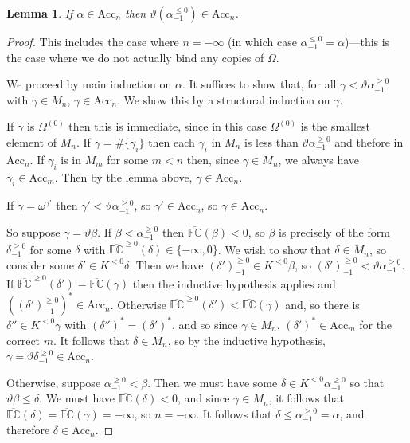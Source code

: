\documentclass[11pt]{amsart}
\newtheorem{lemma}[theorem]{Lemma}
\theoremstyle{definition}
\begin{document}
\begin{lemma}
  If $\alpha\in\mathrm{Acc}_n$ then $\vartheta(\alpha^{\leq 0}_{-1})\in\mathrm{Acc}_n$.
\end{lemma}
\begin{proof}
  This includes the case where $n=-\infty$ (in which case $\alpha^{\leq 0}_{-1}=\alpha$)---this is the case where we do not actually bind any copies of $\Omega$.

  We proceed by main induction on $\alpha$. It suffices to show that, for all $\gamma<\vartheta\alpha^{\geq 0}_{-1}$ with $\gamma\in M_n$, $\gamma\in\mathrm{Acc}_n$. We show this by a structural induction on $\gamma$.

  If $\gamma$ is $\Omega^{(0)}$ then this is immediate, since in this case $\Omega^{(0)}$ is the smallest element of $M_n$. If $\gamma=\#\{\gamma_i\}$ then each $\gamma_i$ in $M_n$ is less than $\vartheta\alpha^{\geq 0}_{-1}$ and thefore in $\mathrm{Acc}_n$. If $\gamma_i$ is in $M_m$ for some $m<n$ then, since $\gamma\in M_n$, we always have $\gamma_i\in\mathrm{Acc}_m$. Then by the lemma above, $\gamma\in\mathrm{Acc}_n$.

  If $\gamma=\omega^{\gamma'}$ then $\gamma'<\vartheta\alpha^{\geq 0}_{-1}$, so $\gamma'\in\mathrm{Acc}_n$, so $\gamma\in\mathrm{Acc}_n$.

  So suppose $\gamma=\vartheta\beta$. If $\beta<\alpha^{\geq 0}_{-1}$ then $\overline{\mathbb{FC}}(\beta)<0$, so $\beta$ is precisely of the form $\delta^{\geq 0}_{-1}$ for some $\delta$ with $\overline{\mathbb{FC}}^{\geq 0}(\delta)\in\{-\infty,0\}$. We wish to show that $\delta\in M_n$, so consider some $\delta'\in K^{< 0}\delta$. Then we have $(\delta')^{\geq 0}_{-1}\in K^{< 0}\beta$, so $(\delta')^{\geq 0}_{-1}<\vartheta\alpha^{\geq 0}_{-1}$. If $\overline{\mathbb{FC}}^{\geq 0}(\delta')=\overline{\mathbb{FC}}(\gamma)$ then the inductive hypothesis applies and $((\delta')^{\geq 0}_{-1})^*\in\mathrm{Acc}_n$. Otherwise $\overline{\mathbb{FC}}^{\geq 0}(\delta')<\overline{\mathbb{FC}}(\gamma)$ and, so there is $\delta''\in K^{< 0}\gamma$ with $(\delta'')^*=(\delta')^*$, and so since $\gamma\in M_n$, $(\delta')^*\in\mathrm{Acc}_m$ for the correct $m$. It follows that $\delta\in M_n$, so by the inductive hypothesis, $\gamma=\vartheta\delta^{\geq 0}_{-1}\in\mathrm{Acc}_n$.

  Otherwise, suppose $\alpha^{\geq 0}_{-1}<\beta$. Then we must have some $\delta\in K^{< 0}\alpha^{\geq 0}_{-1}$ so that $\vartheta\beta\leq\delta$. We must have $\overline{\mathbb{FC}}(\delta)<0$, and since $\gamma\in M_n$, it follows that $\overline{\mathbb{FC}}(\delta)=\overline{\mathbb{FC}}(\gamma)=-\infty$, so $n=-\infty$. It follows that $\delta\leq\alpha^{\geq 0}_{-1}=\alpha$, and therefore $\delta\in\mathrm{Acc}_{n}$.
\end{proof}
\end{document}

